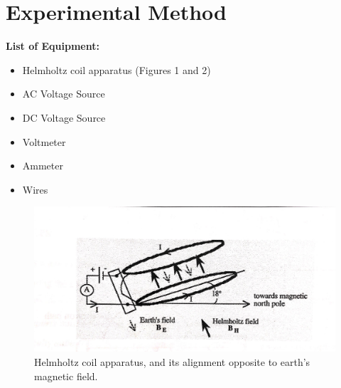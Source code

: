 \documentclass[letterpaper]{article}
\begin{document}
\section{Experimental Method}

\textbf{List of Equipment:}
\begin{itemize}
  \item Helmholtz coil apparatus (Figures 1 and 2)
  \item AC Voltage Source
  \item DC Voltage Source
  \item Voltmeter
  \item Ammeter
  \item Wires
\end{itemize}

\begin{figure}[h!]
    \centering
    \includegraphics[width=\textwidth]{fig1.jpg}
    \caption{Helmholtz coil apparatus, and its alignment opposite to earth's magnetic field. \cite{labmanual}}
\end{figure}
\end{document}
